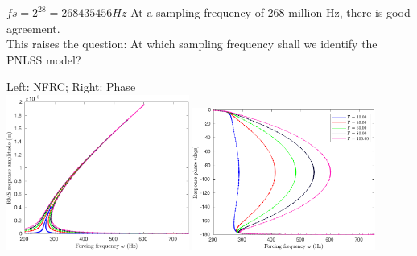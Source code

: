 \documentclass[9pt]{beamer}
\begin{document}
\begin{frame}{$fs=2^{28}=268435456 Hz$}
  At a sampling frequency of 268 million Hz, there is good agreement.\\
  This raises the question: At which sampling frequency shall we identify the
  PNLSS model?
 \begin{center}
    Left: NFRC; Right: Phase\\
    \includegraphics[width=0.45\textwidth]{fig/nfrc/dssex_frf_Amp_fs268435456}
    \includegraphics[width=0.45\textwidth]{fig/nfrc/dssex_frf_Phase_fs268435456}
  \end{center}
\end{frame}
\end{document}
